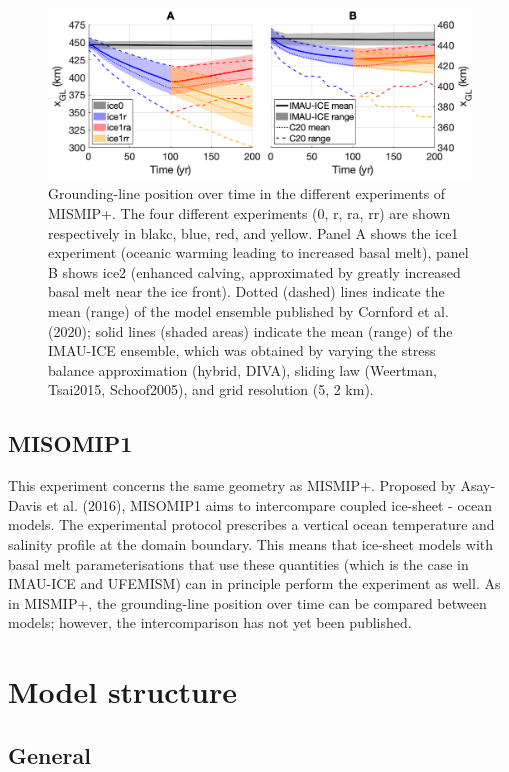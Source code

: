 \documentclass{article}
\begin{document}
\begin{figure}[H]
  \includegraphics[width=0.8\linewidth]{Fig_benchmark_MISMIPplus_GL.png}
  \caption{Grounding-line position over time in the different experiments of MISMIP+. The four different experiments (0, r, ra, rr) are shown respectively in blakc, blue, red, and yellow. Panel A shows the ice1 experiment (oceanic warming leading to increased basal melt), panel B shows ice2 (enhanced calving, approximated by greatly increased basal melt near the ice front). Dotted (dashed) lines indicate the mean (range) of the model ensemble published by Cornford et al. (2020); solid lines (shaded areas) indicate the mean (range) of the IMAU-ICE ensemble, which was obtained by varying the stress balance approximation (hybrid, DIVA), sliding law (Weertman, Tsai2015, Schoof2005), and grid resolution (5, 2 km).}
\end{figure}

\subsection{MISOMIP1}

This experiment concerns the same geometry as MISMIP+. Proposed by Asay-Davis et al. (2016), MISOMIP1 aims to intercompare coupled ice-sheet - ocean models. The experimental protocol prescribes a vertical ocean temperature and salinity profile at the domain boundary. This means that ice-sheet models with basal melt parameterisations that use these quantities (which is the case in IMAU-ICE and UFEMISM) can in principle perform the experiment as well. As in MISMIP+, the grounding-line position over time can be compared between models; however, the intercomparison has not yet been published.

\newpage
\section{Model structure}

\subsection{General}
\end{document}
